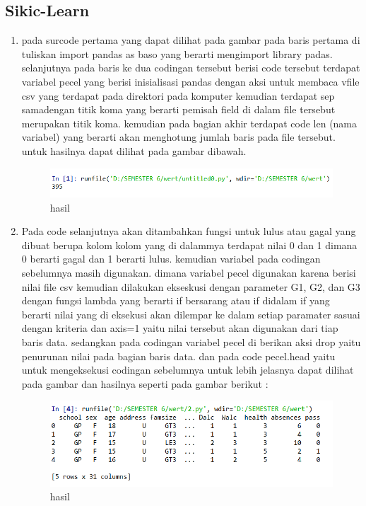 \subsection{Sikic-Learn}
\begin{enumerate}
\item pada surcode pertama yang dapat dilihat pada gambar  pada baris pertama di tuliskan import pandas as baso yang berarti mengimport library padas. selanjutnya pada baris ke dua codingan tersebut berisi code tersebut terdapat variabel pecel yang berisi inisialisasi pandas dengan aksi untuk membaca vfile csv yang terdapat pada direktori pada komputer kemudian terdapat sep samadengan titik koma yang berarti pemisah field di dalam file tersebut merupakan titik koma. kemudian pada bagian akhir terdapat code len (nama variabel) yang berarti akan menghotung jumlah baris pada file tersebut. untuk hasilnya dapat dilihat pada gambar dibawah.

\begin{figure}[ht]
\centering
\includegraphics[scale=0.5]{figures/1174050/chapter2/10.PNG}
\caption{hasil}
\label{contoh}
\end{figure}

\item Pada code selanjutnya akan ditambahkan fungsi untuk lulus atau gagal yang dibuat berupa kolom kolom yang di dalammya terdapat nilai 0 dan 1 dimana 0 berarti gagal dan 1 berarti lulus. kemudian variabel pada codingan sebelumnya masih digunakan. dimana variabel pecel digunakan karena berisi nilai file csv kemudian dilakukan ekseskusi dengan parameter G1, G2, dan G3 dengan fungsi lambda yang berarti if bersarang atau if didalam if yang berarti nilai yang di eksekusi akan dilempar ke dalam setiap paramater sasuai dengan kriteria dan axis=1 yaitu nilai tersebut akan digunakan dari tiap baris data. sedangkan pada codingan variabel pecel di berikan aksi drop yaitu penurunan nilai pada bagian baris data. dan pada code pecel.head yaitu untuk mengeksekusi codingan sebelumnya untuk lebih jelasnya dapat dilihat pada gambar dan hasilnya seperti pada gambar berikut :

\begin{figure}[ht]
\centering
\includegraphics[scale=0.5]{figures/1174050/chapter2/11.PNG}
\caption{hasil}
\label{contoh}
\end{figure}


\end{enumerate}
